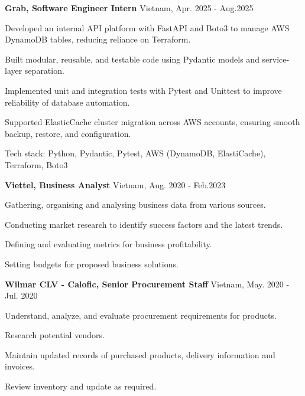 \begin{cventries} %

\cvsimpleentry
    {\textbf{Grab, Software Engineer Intern}} %
    {Vietnam, Apr. 2025 - Aug.2025} %
    {
      \begin{cvitems} %
         \item {Developed an internal API platform with FastAPI and Boto3 to manage AWS DynamoDB tables, reducing reliance on Terraform.}
    \item {Built modular, reusable, and testable code using Pydantic models and service-layer separation.}
    \item {Implemented unit and integration tests with Pytest and Unittest to improve reliability of database automation.}
    \item {Supported ElasticCache cluster migration across AWS accounts, ensuring smooth backup, restore, and configuration.}
     \item {Tech stack: Python, Pydantic, Pytest, AWS (DynamoDB, ElastiCache), Terraform, Boto3}
      \end{cvitems}
    }

  \cvsimpleentry
    {\textbf{Viettel, Business Analyst}} %
    {Vietnam, Aug. 2020 - Feb.2023} %
    {
      \begin{cvitems} %
        \item {Gathering, organising and analysing business data from various sources.}
        \item {Conducting market research to identify success factors and the latest trends.}
        \item {Defining and evaluating metrics for business profitability.}
        \item {Setting budgets for proposed business solutions.}
      \end{cvitems}
    }

  \cvsimpleentry
    {\textbf{Wilmar CLV - Calofic, Senior Procurement Staff}} %
    {Vietnam, May. 2020 - Jul. 2020} %
    {
      \begin{cvitems} %
        \item {Understand, analyze, and evaluate procurement requirements for products.}
        \item {Research potential vendors.}
        \item {Maintain updated records of purchased products, delivery information and invoices.}
        \item {Review inventory and update as required.}
      \end{cvitems}
    }


\end{cventries}
